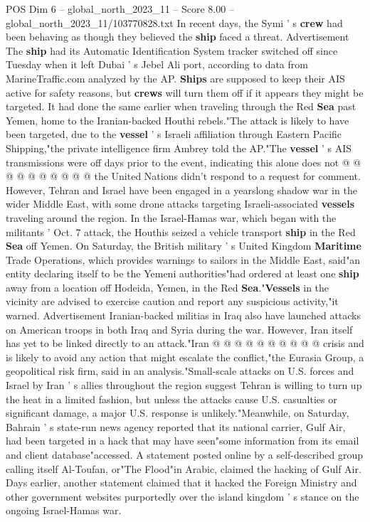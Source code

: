 \begin{textsample}{POS Dim 6 – global\_north\_2023\_11 – Score 8.00 – global\_north\_2023\_11/103770828.txt}
In recent days, the Symi ' s \textbf{crew} had been behaving as though they believed the \textbf{ship} faced a threat.
Advertisement The \textbf{ship} had its Automatic Identification System tracker switched off since Tuesday when it left Dubai ' s Jebel Ali port, according to data from MarineTraffic.com analyzed by the AP. \textbf{Ships} are supposed to keep their AIS active for safety reasons, but \textbf{crews} will turn them off if it appears they might be targeted.
It had done the same earlier when traveling through the Red \textbf{Sea} past Yemen, home to the Iranian-backed Houthi rebels."The attack is likely to have been targeted, due to the \textbf{vessel} ' s Israeli affiliation through Eastern Pacific Shipping,"the private intelligence firm Ambrey told the AP."The \textbf{vessel} ' s AIS transmissions were off days prior to the event, indicating this alone does not @ @ @ @ @ @ @ @ @ @ the United Nations didn't respond to a request for comment.
However, Tehran and Israel have been engaged in a yearslong shadow war in the wider Middle East, with some drone attacks targeting Israeli-associated \textbf{vessels} traveling around the region.
In the Israel-Hamas war, which began with the militants ' Oct. 7 attack, the Houthis seized a vehicle transport \textbf{ship} in the Red \textbf{Sea} off Yemen.
On Saturday, the British military ' s United Kingdom \textbf{Maritime} Trade Operations, which provides warnings to sailors in the Middle East, said"an entity declaring itself to be the Yemeni authorities"had ordered at least one \textbf{ship} away from a location off Hodeida, Yemen, in the Red \textbf{Sea}."\textbf{Vessels} in the vicinity are advised to exercise caution and report any suspicious activity,"it warned.
Advertisement Iranian-backed militias in Iraq also have launched attacks on American troops in both Iraq and Syria during the war.
However, Iran itself has yet to be linked directly to an attack."Iran @ @ @ @ @ @ @ @ @ @ crisis and is likely to avoid any action that might escalate the conflict,"the Eurasia Group, a geopolitical risk firm, said in an analysis."Small-scale attacks on U.S. forces and Israel by Iran ' s allies throughout the region suggest Tehran is willing to turn up the heat in a limited fashion, but unless the attacks cause U.S. casualties or significant damage, a major U.S. response is unlikely."Meanwhile, on Saturday, Bahrain ' s state-run news agency reported that its national carrier, Gulf Air, had been targeted in a hack that may have seen"some information from its email and client database"accessed.
A statement posted online by a self-described group calling itself Al-Toufan, or"The Flood"in Arabic, claimed the hacking of Gulf Air.
Days earlier, another statement claimed that it hacked the Foreign Ministry and other government websites purportedly over the island kingdom ' s stance on the ongoing Israel-Hamas war.

\end{textsample}

